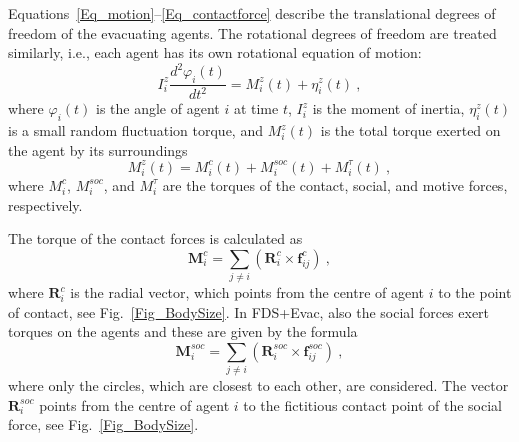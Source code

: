 \documentclass[12pt,a4paper,final,twoside]{stylevk}
\begin{document}
Equations~\ref{Eq_motion}--\ref{Eq_contactforce} describe the
translational degrees of freedom of the evacuating agents.  The
rotational degrees of freedom are treated similarly, i.e., each
agent has its own rotational equation of motion:
%
\begin{equation}\label{Eq_rotmotion}
   I^z_{i} \frac{d^2 \varphi_i (t)}{dt^2} = {M}^z_{i} (t)  +
  {\eta}^z_{i} (t) ~,  
\end{equation}
%
where $\varphi_i(t)$ is the angle of agent $i$ at time $t$,
$I^z_{i}$ is the moment of inertia, ${\eta}^z_{i} (t)$ is a small
random fluctuation torque, and ${M}^z_{i} (t)$ is the total torque
exerted on the agent by its surroundings
%
\begin{equation}\label{Eq_total_torque}
  {M}^z_{i} (t) =  {M}^c_{i} (t) + {M}^{soc}_{i} (t) +  {M}^{\tau}_{i}
  (t) ~,
\end{equation}
%
where ${M}^c_{i}$, ${M}^{soc}_{i}$, and ${M}^{\tau}_{i}$ are the
torques of the contact, social, and motive forces, respectively.


The torque of the contact forces is calculated as
%
\begin{equation}\label{Eq_fc_torque}
  \mathbf{M}^c_{i} = \sum_{j \ne i} \left( \mathbf{R}^c_{i} \times
  \mathbf{f}_{ij}^{c} \right) ~, 
\end{equation}
%
where $\mathbf{R}^c_{i}$ is the radial vector, which points from the
centre of agent $i$ to the point of contact, see
Fig.~\ref{Fig_BodySize}.  In FDS+Evac, also the social forces exert
torques on the agents and these are given by the formula
%
\begin{equation}\label{Eq_soc_torque}
  \mathbf{M}^{soc}_{i} =  \sum_{j \ne i} \left( \mathbf{R}^{soc}_{i}
  \times \mathbf{f}_{ij}^{soc} \right) ~,
\end{equation}
%
where only the circles, which are closest to each other, are
considered.  The vector $\mathbf{R}^{soc}_{i}$ points from the centre
of agent $i$ to the fictitious contact point of the social force, see
Fig.~\ref{Fig_BodySize}.
\end{document}
